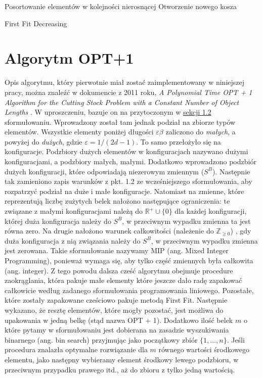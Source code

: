 \begin{pseudokod}[H]
	Posortowanie elementów w kolejności nierosnącej \;
	Otworzenie nowego kosza \;
	
	\caption{First Fit Decreasing}
\end{pseudokod}

\section{Algorytm OPT+1}
Opis algorytmu, który pierwotnie miał zostać zaimplementowany w niniejszej pracy, można znaleźć w dokumencie z 2011 roku, \textit{A Polynomial Time OPT + 1 Algorithm for the Cutting Stock Problem with a Constant Number of Object Lengths} \cite{ALG_OPT_1}. 
W uproszczeniu, bazuje on na przytoczonym w 
\hyperlink{section.1.2}{sekcji 1.2} sformułowaniu.
Wprowadzony został tam jednak podział na zbiorze typów elementów. 
Wszystkie elementy poniżej długości $\varepsilon\beta$ zaliczono do \textit{małych}, a powyżej do \textit{dużych}, gdzie $\varepsilon = 1/(2d-1)$. To samo przełożyło się na konfiguracje. Podzbiory dużych elementów w konfiguracjach nazywano dużymi konfiguracjami, a podzbiory małych, małymi. Dodatkowo wprowadzono podzbiór dużych konfiguracji, które odpowiadają niezerowym zmiennym ($S^B$). Następnie tak zamieniono zapis warunków z pkt. 1.2 ze wcześniejszego sformułowania, aby rozpatrzyć podział na duże i małe konfiguracje. Natomiast na zmienne, które reprezentują liczbę zużytych belek nałożono następujące ograniczenia: te związane z małymi konfiguracjami należą do $\mathbb{R}^+\cup \{0\}$ dla każdej konfiguracji, której duża konfiguracja należy do $S^B$, w przeciwnym wypadku zmienna ta jest równa zero. Na drugie nałożono warunek całkowitości (należenie do $\mathbb{Z}_{\geq 0}$) , gdy duża konfiguracja z nią związania należy do $S^B$, w przeciwnym wypadku zmienna jest zerowana.
Takie sformułowanie nazywamy MIP (ang. Mixed Integer Programming), ponieważ wymaga się, aby tylko część zmiennych była całkowita (ang. integer).
Z tego powodu dalsza cześć algorytmu obejmuje procedure zaokrąglania, która pakuje małe elementy które jeszcze dało radę zapakować całkowicie według zadanego sformułowania programowania liniowego. Pozostałe, które zostały zapakowane cześciowo pakuje metodą First Fit. Następnie wykazano, że resztę elementów, które mogły pozostać, jest możliwa do upakowania w jedną belkę (stąd nazwa OPT + 1). Dodatkowo ilość belek $m$ o które pytamy w sformułowaniu jest dobierana na zasadzie wyszukiwania binarnego (ang. bin search) przyjmując jako początkowy zbiór $\{1,\dots, n\}$. Jeśli procedura znalazła optymalne rozwiązanie dla $m$ równego wartości środkowego elementu, jako następny wybieramy element środkowy lewego podzbioru, w przeciwnym przypadku prawego itd., aż do zbioru z tylko jedną wartością. \\
